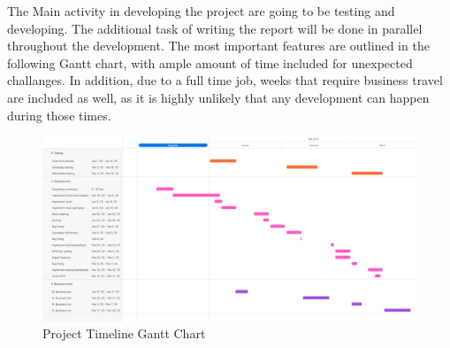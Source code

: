 \documentclass{article}
\begin{document}
The Main activity in developing the project are going to be testing and developing. The additional task of writing the report will be done in parallel throughout the development. The most important features are outlined in the following Gantt chart, with ample amount of time included for unexpected challanges.
In addition, due to a full time job, weeks that require business travel are included as well, as it is highly unlikely that any development can happen during those times.
\begin{figure}[H]
    \centering
    \includegraphics[width=\textwidth]{gantt.png}
    \caption{Project Timeline Gantt Chart}
    \label{fig:gantt}
\end{figure}
\end{document}
